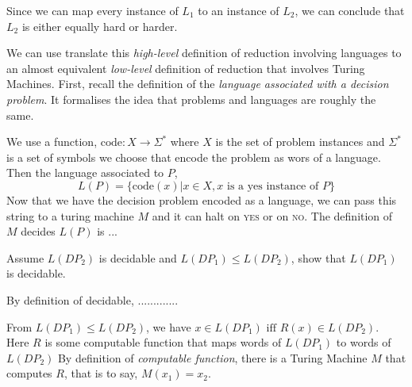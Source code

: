 Since we can map every instance of $L_1$ to an instance of $L_2$, 
we can conclude that $L_2$ is either equally hard or harder.



\frmrule

We can use translate this \textit{high-level} definition of reduction
involving languages to an almost equivalent 
\textit{low-level} definition of reduction that involves 
Turing Machines. First, recall the definition of the 
\textit{language associated with a decision problem}. It formalises the idea 
that problems and languages are roughly the same. 

We use a function, $\text{code}:X \rightarrow \Sigma^{*}$ where $X$ is the set of
problem instances and $\Sigma^{*}$ is a set of symbols we choose that encode 
the problem as wors of a language. Then the language associated to $P$, 
$$L(P) = \{\text{code}(x) | x \in X, x \text{ is a yes instance of } P\}$$
Now that we have the decision problem encoded as a language, we can pass this 
string to a turing machine $M$ and it can halt on \textsc{yes} or 
on \textsc{no}.
The definition of $M$ decides $L(P)$ is ...


\begin{example}
Assume $L(DP_2)$ is decidable and $L(DP_1) \leqslant L(DP_2)$, show that $L(DP_1)$ is decidable.
\end{example}

By definition of decidable, .............


From $L(DP_1) \leqslant L(DP_2)$, we have
$x \in L(DP_1) \text{ iff } R(x) \in L(DP_2)$. \\ 
Here $R$ is some computable function
that maps words of $L(DP_1)$ to words of $L(DP_2)$
By definition of \textit{computable function}, there is a Turing Machine $M$ 
that computes $R$, that is to say, $M(x_1) = x_2$. 

